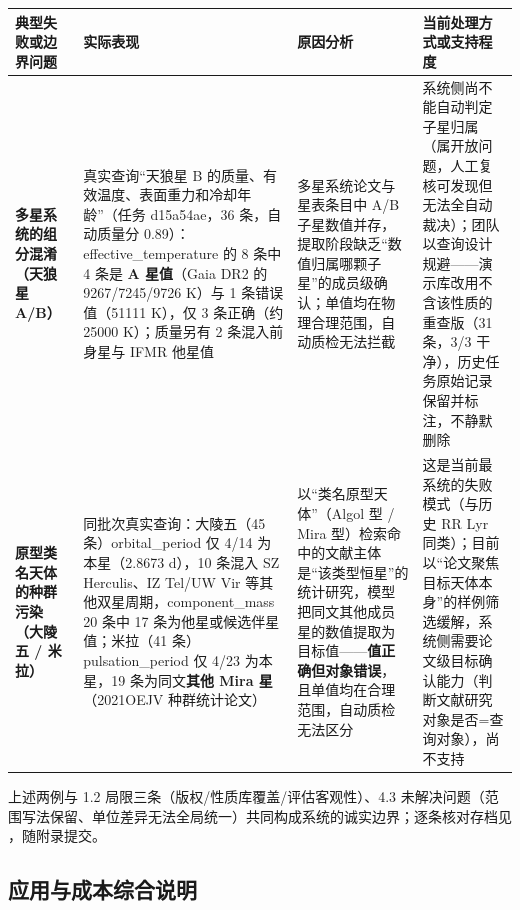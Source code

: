 \begin{longtable}{@{}p{2.6cm}p{4.6cm}p{3.8cm}p{3.4cm}@{}}
\toprule
典型失败或边界问题 & 实际表现 & 原因分析 & 当前处理方式或支持程度 \\
\midrule
\textbf{多星系统的组分混淆（天狼星 A/B）} & 真实查询“天狼星 B 的质量、有效温度、表面重力和冷却年龄”（任务 d15a54ae，36 条，自动质量分 0.89）：effective\_temperature 的 8 条中 4 条是 \textbf{A 星值}（Gaia DR2 的 9267/7245/9726 K）与 1 条错误值（51111 K），仅 3 条正确（约 25000 K）；质量另有 2 条混入前身星与 IFMR 他星值 & 多星系统论文与星表条目中 A/B 子星数值并存，提取阶段缺乏“数值归属哪颗子星”的成员级确认；单值均在物理合理范围，自动质检无法拦截 & 系统侧尚不能自动判定子星归属（属开放问题，人工复核可发现但无法全自动裁决）；团队以查询设计规避——演示库改用不含该性质的重查版（31 条，3/3 干净），历史任务原始记录保留并标注，不静默删除 \\
\textbf{原型类名天体的种群污染（大陵五 / 米拉）} & 同批次真实查询：大陵五（45 条）orbital\_period 仅 4/14 为本星（2.8673 d），10 条混入 SZ Herculis、IZ Tel/UW Vir 等其他双星周期，component\_mass 20 条中 17 条为他星或候选伴星值；米拉（41 条）pulsation\_period 仅 4/23 为本星，19 条为同文\textbf{其他 Mira 星}（2021OEJV 种群统计论文） & 以“类名原型天体”（Algol 型 / Mira 型）检索命中的文献主体是“该类型恒星”的统计研究，模型把同文其他成员星的数值提取为目标值——\textbf{值正确但对象错误}，且单值均在合理范围，自动质检无法区分 & 这是当前最系统的失败模式（与历史 RR Lyr 同类）；目前以“论文聚焦目标天体本身”的样例筛选缓解，系统侧需要论文级目标确认能力（判断文献研究对象是否=查询对象），尚不支持 \\
\bottomrule
\end{longtable}

\noindent 上述两例与 1.2 局限三条（版权/性质库覆盖/评估客观性）、4.3 未解决问题（范围写法保留、单位差异无法全局统一）共同构成系统的诚实边界；逐条核对存档见 ，随附录提交。

\subsection{应用与成本综合说明}

